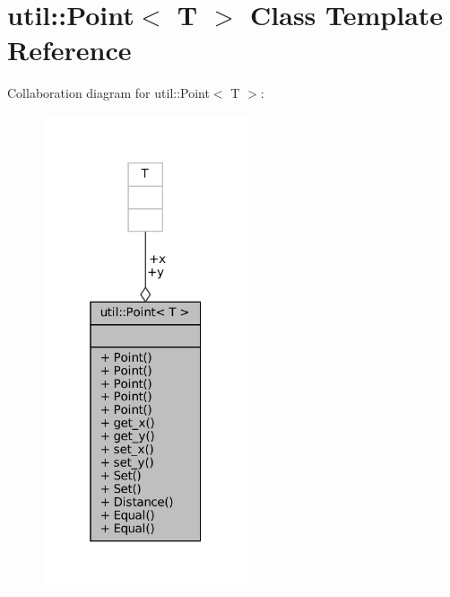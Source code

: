 \hypertarget{classutil_1_1Point}{}\section{util\+:\+:Point$<$ T $>$ Class Template Reference}
\label{classutil_1_1Point}


Collaboration diagram for util\+:\+:Point$<$ T $>$\+:
\nopagebreak
\begin{figure}[H]
\begin{center}
\leavevmode
\includegraphics[width=172pt]{classutil_1_1Point__coll__graph}
\end{center}
\end{figure}
